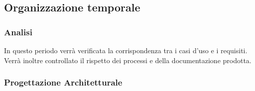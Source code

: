 



\subsection{Organizzazione temporale}


\subsubsection{Analisi}

In questo periodo verrà verificata la corrispondenza tra i casi d'uso
e i requisiti. Verrà inoltre controllato il rispetto dei processi e
della documentazione prodotta.

\subsubsection{Progettazione Architetturale}

